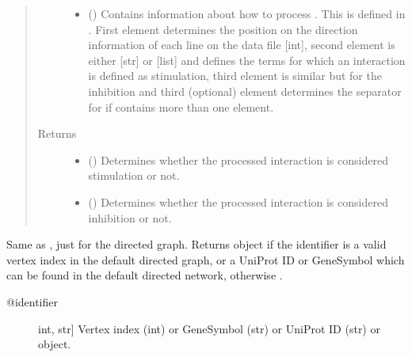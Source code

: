\documentclass[letterpaper,10pt,english]{sphinxmanual}
\begin{document}
\begin{fulllineitems}
\begin{fulllineitems}
\begin{quote}
\begin{description}
\begin{itemize}
\item {} 
 () \textendash{} Contains information about how to process . This
is defined in . First element
determines the position on the direction information of each
line on the data file {[}int{]}, second element is either {[}str{]}
or {[}list{]} and defines the terms for which an interaction is
defined as stimulation, third element is similar but for the
inhibition and third (optional) element determines the
separator for  if contains more than one element.

\end{itemize}

\item[{Returns}] \leavevmode
\begin{itemize}
\item {} 
() \textendash{} Determines whether the processed interaction
is considered stimulation or not.

\item {} 
() \textendash{} Determines whether the processed interaction
is considered inhibition or not.

\end{itemize}


\end{description}\end{quote}

\end{fulllineitems}


\begin{fulllineitems}
\label{\detokenize{reference:pypath.main.PyPath.protein}}
Same as , just for the directed graph.
Returns  object if the identifier
is a valid vertex index in the default directed graph,
or a UniProt ID or GeneSymbol which can be found in the
default directed network, otherwise .
\begin{description}
\item[{@identifier}] \leavevmode{[}int, str{]}
Vertex index (int) or GeneSymbol (str) or UniProt ID (str) or
 object.


\end{description}
\end{fulllineitems}
\end{fulllineitems}
\end{document}

